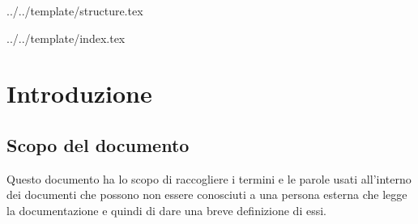 


\def\DOCUMENTO{Glossario}
\def\VERSIONE{1.0.0}

\def\REDATTORE {Agostinetto Matteo\\ & Carraro Nicola\\ & Crespan Emanuele\\ & Ros Fabio}
\def\VERIFICATORE {Suierica Bogdan}
\def\RESPONSABILE {Burlin Valerio}

\def\USO {Esterno}

\def\DISTRIBUZIONE {\COMMITTENTE{}\\ & \PROPONENTE{}\\}

\def\DESCRIZIONE {Documento con la descrizione dei termini tecnici poco conosciuti.}


\def\INDICE	{false}
\def\TABELLE {false}
\def\FIGURE {false}


 {../../template/structure.tex}


 {../../template/index.tex}

\section{Introduzione}
\subsection{Scopo del documento}
Questo documento ha lo scopo di raccogliere i termini e le parole usati all'interno dei documenti che possono non essere conosciuti a una persona esterna che legge la documentazione e quindi di dare una breve definizione di essi.
\newpage


\glsaddall



\printglossary[title=Glossario, nonumberlist]


